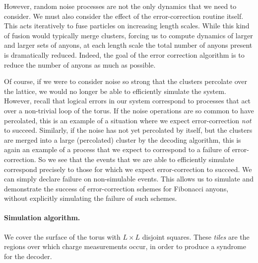 \documentclass[aps, prl, letterpaper, twocolumn, superscriptaddress, notitlepage]{revtex4-1}
\begin{document}
However, random noise processes are not the only dynamics that we need to consider. We 
must also consider the effect of the error-correction routine itself. This acts iteratively to fuse 
particles on increasing length scales. While this kind of fusion would typically merge clusters, 
forcing us to compute dynamics of larger and larger sets of anyons, at each length scale the 
total number of anyons present is dramatically reduced. Indeed, the goal of the error 
correction algorithm is to reduce the number of anyons as much as possible.

   

Of course, if we were to consider noise so strong that the clusters percolate over the lattice, we would no longer be able to efficiently simulate the system. However, recall that logical errors in our system correspond to processes that act over a non-trivial loop of the torus. If the noise operations are so common to have percolated, this is an example of a situation where we expect error-correction \emph{not} to succeed. Similarly, if the noise has not yet percolated by itself, but the clusters are merged into a large (percolated) cluster by the decoding algorithm, this is again an example of a process that we expect to correspond to a failure of error-correction. So we see that the events that we are able to efficiently simulate correspond precisely to those for which we expect error-correction to succeed. We can simply declare failure on non-simulable events. This allows us to simulate and demonstrate the success of error-correction schemes for Fibonacci anyons, without explicitly simulating the failure of such schemes.

\paragraph{Simulation algorithm.}

We cover the surface of the torus with $L\times L$ disjoint squares. These \emph{tiles} are the regions over which
charge measurements occur, in order to produce a syndrome for the decoder.
\end{document}

